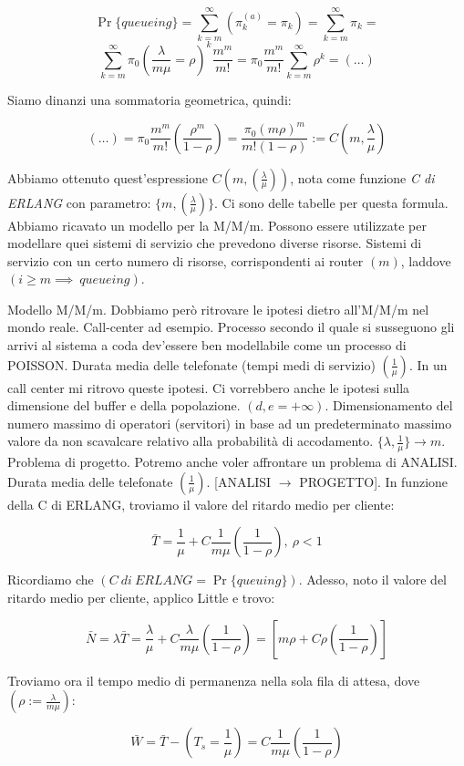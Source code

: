 \[
	\Pr\{queueing\} = \sum_{k=m}^\infty{(\pi_k^{(a)}=\pi_k)} = \sum_{k=m}^\infty{\pi_k} =
\]
\[
	\sum_{k=m}^\infty{\pi_0(\frac{\lambda}{m\mu} = \rho)^k \frac{m^m}{m!}} = \pi_0\frac{m^m}{m!}\sum_{k=m}^\infty{\rho^k} = (\dots)
\]

Siamo dinanzi una sommatoria geometrica, quindi:

\[
	(\dots) = \pi_0\frac{m^m}{m!} (\frac{\rho^m}{1-\rho}) = \frac{\pi_0(m\rho)^m}{m!(1-\rho)} := C(m,\frac{\lambda}{\mu})
\]

Abbiamo ottenuto quest'espressione $C(m,(\frac{\lambda}{\mu}))$, nota come funzione \textit{C di ERLANG} con parametro: $\{m,(\frac{\lambda}{\mu})\}$. Ci sono delle tabelle per questa formula. Abbiamo ricavato un modello per la M/M/m. Possono essere utilizzate per modellare quei sistemi di servizio che prevedono diverse risorse. Sistemi di servizio con un certo numero di risorse, corrispondenti ai router $(m)$, laddove $(i\geq m \implies\ queueing)$.

Modello M/M/m. Dobbiamo però ritrovare le ipotesi dietro all'M/M/m nel mondo reale. Call-center ad esempio. Processo secondo il quale si susseguono gli arrivi al sistema a coda dev'essere ben modellabile come un processo di POISSON. Durata media delle telefonate (tempi medi di servizio) $(\frac{1}{\mu})$. In un call center mi ritrovo queste ipotesi. Ci vorrebbero anche le ipotesi sulla dimensione del buffer e della popolazione. $(d,e = +\infty)$. Dimensionamento del numero massimo di operatori (servitori) in base ad un predeterminato massimo valore da non scavalcare relativo alla probabilità di accodamento. $\{\lambda,\frac{1}{\mu}\} \to m$. Problema di progetto. Potremo anche voler affrontare un problema di ANALISI. Durata media delle telefonate $(\frac{1}{\mu})$. [ANALISI $\rightarrow$ PROGETTO]. In funzione della C di ERLANG, troviamo il valore del ritardo medio per cliente:

\[
	\bar{T} = \frac{1}{\mu} + C\frac{1}{m\mu}(\frac{1}{1-\rho}),\ \rho<1
\]

Ricordiamo che $(C\ di\ ERLANG = \Pr\{queuing\})$. Adesso, noto il valore del ritardo medio per cliente, applico Little e trovo:

\[
	\bar{N} = \lambda\bar{T} = \frac{\lambda}{\mu} + C\frac{\lambda}{m\mu}(\frac{1}{1-\rho}) = [m\rho + C\rho(\frac{1}{1-\rho})]
\]

Troviamo ora il tempo medio di permanenza nella sola fila di attesa, dove $(\rho := \frac{\lambda}{m\mu})$:

\[
	\bar{W} = \bar{T} - (T_s = \frac{1}{\mu}) = C\frac{1}{m\mu}(\frac{1}{1-\rho})
\]


